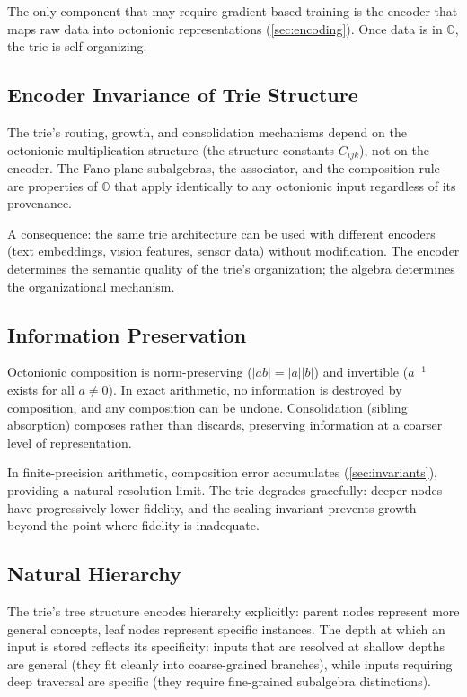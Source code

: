 \documentclass[11pt,a4paper]{article}
\theoremstyle{definition}
\theoremstyle{remark}
\newcommand{\Oct}{\mathbb{O}}
\begin{document}
The only component that may require gradient-based training is the encoder that maps raw data into octonionic representations (\cref{sec:encoding}). Once data is in $\Oct$, the trie is self-organizing.

\subsection{Encoder Invariance of Trie Structure}

The trie's routing, growth, and consolidation mechanisms depend on the octonionic multiplication structure (the structure constants $C_{ijk}$), not on the encoder. The Fano plane subalgebras, the associator, and the composition rule are properties of $\Oct$ that apply identically to any octonionic input regardless of its provenance.

A consequence: the same trie architecture can be used with different encoders (text embeddings, vision features, sensor data) without modification. The encoder determines the semantic quality of the trie's organization; the algebra determines the organizational mechanism.

\subsection{Information Preservation}

Octonionic composition is norm-preserving ($\lvert ab \rvert = \lvert a \rvert \lvert b \rvert$) and invertible ($a^{-1}$ exists for all $a \neq 0$). In exact arithmetic, no information is destroyed by composition, and any composition can be undone. Consolidation (sibling absorption) composes rather than discards, preserving information at a coarser level of representation.

In finite-precision arithmetic, composition error accumulates (\cref{sec:invariants}), providing a natural resolution limit. The trie degrades gracefully: deeper nodes have progressively lower fidelity, and the scaling invariant prevents growth beyond the point where fidelity is inadequate.

\subsection{Natural Hierarchy}

The trie's tree structure encodes hierarchy explicitly: parent nodes represent more general concepts, leaf nodes represent specific instances. The depth at which an input is stored reflects its specificity: inputs that are resolved at shallow depths are general (they fit cleanly into coarse-grained branches), while inputs requiring deep traversal are specific (they require fine-grained subalgebra distinctions).
\end{document}
